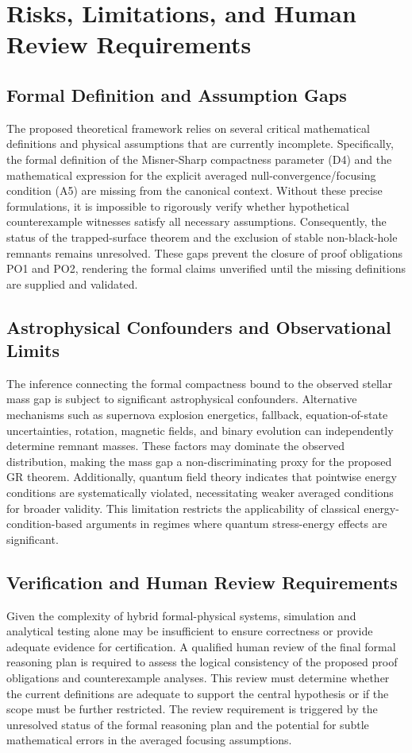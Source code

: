 \documentclass[conference]{IEEEtran}
\begin{document}
\section{Risks, Limitations, and Human Review Requirements}
\subsection{Formal Definition and Assumption Gaps}
The proposed theoretical framework relies on several critical mathematical definitions and physical assumptions that are currently incomplete. Specifically, the formal definition of the Misner-Sharp compactness parameter (D4) and the mathematical expression for the explicit averaged null-convergence/focusing condition (A5) are missing from the canonical context. Without these precise formulations, it is impossible to rigorously verify whether hypothetical counterexample witnesses satisfy all necessary assumptions. Consequently, the status of the trapped-surface theorem and the exclusion of stable non-black-hole remnants remains unresolved. These gaps prevent the closure of proof obligations PO1 and PO2, rendering the formal claims unverified until the missing definitions are supplied and validated.

\subsection{Astrophysical Confounders and Observational Limits}
The inference connecting the formal compactness bound to the observed stellar mass gap is subject to significant astrophysical confounders. Alternative mechanisms such as supernova explosion energetics, fallback, equation-of-state uncertainties, rotation, magnetic fields, and binary evolution can independently determine remnant masses. These factors may dominate the observed distribution, making the mass gap a non-discriminating proxy for the proposed GR theorem. Additionally, quantum field theory indicates that pointwise energy conditions are systematically violated, necessitating weaker averaged conditions for broader validity. This limitation restricts the applicability of classical energy-condition-based arguments in regimes where quantum stress-energy effects are significant.~\cite{cite_0ed84243cf171bc4}

\subsection{Verification and Human Review Requirements}
Given the complexity of hybrid formal-physical systems, simulation and analytical testing alone may be insufficient to ensure correctness or provide adequate evidence for certification. A qualified human review of the final formal reasoning plan is required to assess the logical consistency of the proposed proof obligations and counterexample analyses. This review must determine whether the current definitions are adequate to support the central hypothesis or if the scope must be further restricted. The review requirement is triggered by the unresolved status of the formal reasoning plan and the potential for subtle mathematical errors in the averaged focusing assumptions.~\cite{cite_63476e0b002da386}
\end{document}
